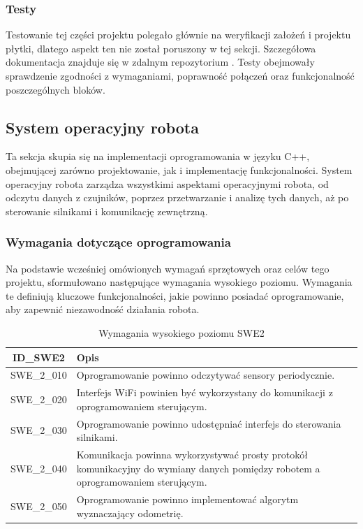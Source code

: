 \documentclass[12pt,twoside]{article}
\begin{document}
\subsubsection{Testy}
Testowanie tej części projektu polegało głównie na weryfikacji założeń i projektu płytki, dlatego aspekt ten nie został poruszony w tej sekcji. Szczegółowa dokumentacja znajduje się w zdalnym repozytorium \cite{repo}. Testy obejmowały sprawdzenie zgodności z wymaganiami, poprawność połączeń oraz funkcjonalność poszczególnych bloków.

\newpage

\subsection{System operacyjny robota}

Ta sekcja skupia się na implementacji oprogramowania w języku C++, obejmującej zarówno projektowanie, jak i implementację funkcjonalności. System operacyjny robota zarządza wszystkimi aspektami operacyjnymi robota, od odczytu danych z czujników, poprzez przetwarzanie i analizę tych danych, aż po sterowanie silnikami i komunikację zewnętrzną.

\subsubsection{Wymagania dotyczące oprogramowania}

Na podstawie wcześniej omówionych wymagań sprzętowych oraz celów tego projektu, sformułowano następujące wymagania wysokiego poziomu. Wymagania te definiują kluczowe funkcjonalności, jakie powinno posiadać oprogramowanie, aby zapewnić niezawodność działania robota.

\begin{table}[ht]
\caption{Wymagania wysokiego poziomu SWE2}
\centering		
	\begin{tabular}{|c|p{}|}	
		\hline
		ID\_SWE2 & Opis \\
		\hline
		SWE\_2\_010 & Oprogramowanie powinno odczytywać sensory periodycznie. \\
		\hline
		SWE\_2\_020 & Interfejs WiFi powinien być wykorzystany do komunikacji z oprogramowaniem sterującym. \\
		\hline 
		SWE\_2\_030 & Oprogramowanie powinno udostępniać interfejs do sterowania silnikami.\\
		\hline
		SWE\_2\_040 & Komunikacja powinna wykorzystywać prosty protokół komunikacyjny do wymiany danych pomiędzy robotem a oprogramowaniem sterującym. \\
		\hline
		SWE\_2\_050 & Oprogramowanie powinno implementować algorytm wyznaczający odometrię. \\
		\hline

	\end{tabular}	
	
\label{Tab:SWE2}
\end{table}	
\end{document}
